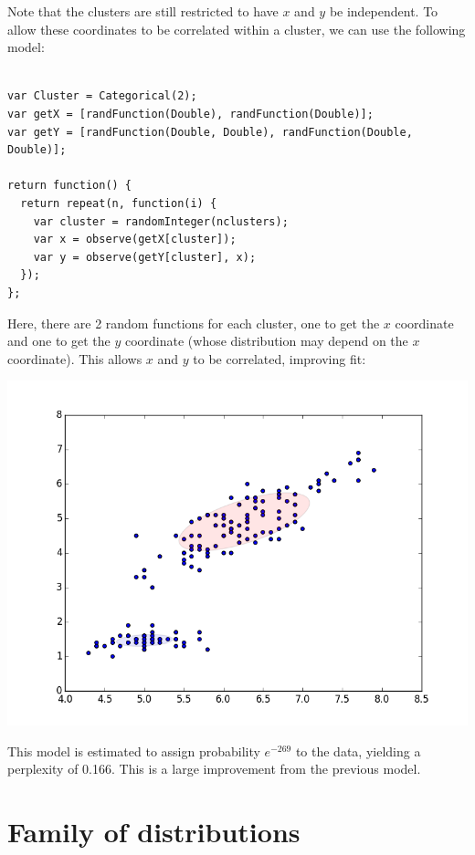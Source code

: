 \documentclass{article}
\begin{document}
  Note that the clusters are still restricted to have $x$ and $y$ be independent.  To allow these coordinates
  to be correlated within a cluster, we can use the following model:

\begin{verbatim}

var Cluster = Categorical(2);
var getX = [randFunction(Double), randFunction(Double)];
var getY = [randFunction(Double, Double), randFunction(Double, Double)];

return function() {
  return repeat(n, function(i) {
    var cluster = randomInteger(nclusters);
    var x = observe(getX[cluster]);
    var y = observe(getY[cluster], x);
  });
};
\end{verbatim}
  
  Here, there are 2 random functions for each cluster, one to get the $x$ coordinate and one to get the $y$ coordinate (whose distribution may depend on the $x$ coordinate).  This allows $x$ and $y$ to be correlated, improving fit:

  \begin{center}
    \includegraphics[scale=0.5]{../plots/irisclusters_dep.png}
  \end{center}

  This model is estimated to assign probability $e^{-269}$ to the data, yielding a perplexity of 0.166.  This is a large improvement from the previous model.


  \section{Family of distributions}
  
\end{document}
